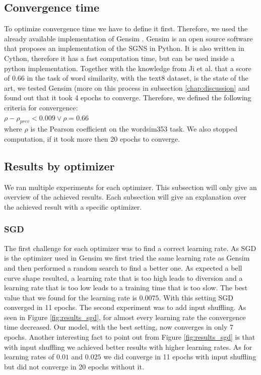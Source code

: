\documentclass[conference]{IEEEtran}
\begin{document}
\subsection{Convergence time}
To optimize convergence time we have to define it first. Therefore, we used the already available implementation of Gensim \cite{gensim}. Gensim is an open source software that proposes an implementation of the SGNS in Python. It is also written in Cython, therefore it has a fast computation time, but can be used inside a python implementation. Together with the knowledge from Ji et al.\cite{intel} that a score of $0.66$ in the task of word similarity, with the text8 dataset, is the state of the art, we tested Gensim (more on this process in subsection \ref{chap:discussion} and found out that it took 4 epochs to converge. Therefore, we defined the following criteria for convergence: \\
$\rho - \rho_{prev} < 0.009 \vee \rho = 0.66$ \\
where $\rho$ is the Pearson coefficient on the wordsim353 task.
We also stopped computation, if it took more then 20 epochs to converge.

\subsection{Results by optimizer}
We ran multiple experiments for each optimizer. This subsection will only give an overview of the achieved results. Each subsection will give an explanation over the achieved result with a specific optimizer.

\subsubsection{SGD}
The first challenge for each optimizer was to find a correct learning rate. As SGD is the optimizer used in Gensim \cite{gensim} we first tried the same learning rate as Gensim \cite{gensim} and then performed a random search to find a better one. As expected a bell curve shape resulted, a learning rate that is too high leads to diversion and a learning rate that is too low leads to a training time that is too slow. The best value that we found for the learning rate is $0.0075$. With this setting SGD converged in 11 epochs. The second experiment was to add input shuffling.
As seen in Figure \ref{fig:results_sgd}, for almost every learning rate the convergence time decreased. Our model, with the best setting, now converges in only 7 epochs. Another interesting fact to point out from Figure \ref{fig:results_sgd} is that with input shuffling we achieved better results with higher learning rates. As for learning rates of $0.01$ and $0.025$ we did converge in 11 epochs with input shuffling but did not converge in 20 epochs without it.
\end{document}
